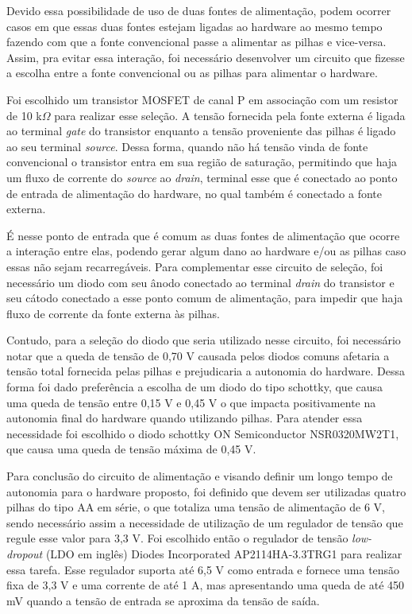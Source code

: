 Devido essa possibilidade de uso de duas fontes de alimentação, podem ocorrer casos em que essas duas fontes estejam ligadas ao hardware ao mesmo tempo fazendo com que a fonte convencional passe a alimentar as pilhas e vice-versa. Assim, pra evitar essa interação, foi necessário desenvolver um circuito que fizesse a escolha entre a fonte convencional ou as pilhas para alimentar o hardware. 

Foi escolhido um transistor \gls{MOSFET} de canal P em associação com um resistor de 10 k$\Omega$ para realizar esse seleção. A tensão fornecida pela fonte externa é ligada ao terminal \textit{gate} do transistor enquanto a tensão proveniente das pilhas é ligado ao seu terminal \textit{source}. Dessa forma, quando não há tensão vinda de fonte convencional o transistor entra em sua região de saturação, permitindo que haja um fluxo de corrente do \textit{source} ao \textit{drain}, terminal esse que é conectado ao ponto de entrada de alimentação do hardware, no qual também é conectado a fonte externa. 

É nesse ponto de entrada que é comum as duas fontes de alimentação que ocorre a interação entre elas, podendo gerar algum dano ao hardware e/ou as pilhas caso essas não sejam recarregáveis. Para complementar esse circuito de seleção, foi necessário um diodo com seu ânodo conectado ao terminal \textit{drain} do transistor e seu cátodo conectado a esse ponto comum de alimentação, para impedir que haja fluxo de corrente da fonte externa às pilhas. 

Contudo, para a seleção do diodo que seria utilizado nesse circuito, foi necessário notar que a queda de tensão de 0,70 V causada pelos diodos comuns afetaria a tensão total fornecida pelas pilhas e prejudicaria a autonomia do hardware. Dessa forma foi dado preferência a escolha de um diodo do tipo schottky, que causa uma queda de tensão entre 0,15 V e 0,45 V o que impacta positivamente na autonomia final do hardware quando utilizando pilhas. Para atender essa necessidade foi escolhido o diodo schottky ON Semiconductor NSR0320MW2T1, que causa uma queda de tensão máxima de 0,45 V.

Para conclusão do circuito de alimentação e visando definir um longo tempo de autonomia para o hardware proposto, foi definido que devem ser utilizadas quatro pilhas do tipo AA em série, o que totaliza uma tensão de alimentação de 6 V, sendo necessário assim a necessidade de utilização de um regulador de tensão que regule esse valor para 3,3 V. Foi escolhido então o regulador de tensão \textit{low-dropout} (LDO em inglês) Diodes Incorporated AP2114HA-3.3TRG1 para realizar essa tarefa. Esse regulador suporta até 6,5 V como entrada e fornece uma tensão fixa de 3,3 V e uma corrente de até 1 A, mas apresentando uma queda de até 450 mV quando a tensão de entrada se aproxima da tensão de saída. 

